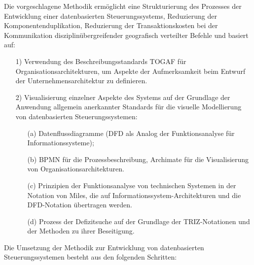 \documentclass[11pt,a4paper]{article}
\begin{document}
Die vorgeschlagene Methodik ermöglicht eine Strukturierung des Prozesses der
Entwicklung einer datenbasierten Steuerungssystems, Reduzierung der
Komponentenduplikation, Reduzierung der Transaktionskosten bei der
Kommunikation disziplinübergreifender geografisch verteilter Befehle und
basiert auf:
\begin{itemize}
\item[1)] Verwendung des Beschreibungsstandards TOGAF für
  Organisationsarchitekturen, um Aspekte der Aufmerksamkeit beim Entwurf der
  Unternehmensarchitektur zu definieren.
\item[2)] Visualisierung einzelner Aspekte des Systems auf der Grundlage der
  Anwendung allgemein anerkannter Standards für die visuelle Modellierung von
  datenbasierten Steuerungssystemen:
  \begin{itemize}
  \item[(a)] Datenflussdiagramme (DFD als Analog der Funktionsanalyse für
    Informationssysteme);
  \item[(b)] BPMN für die Prozessbeschreibung, Archimate für die
    Visualisierung von Organisationsarchitekturen.
  \item[(c)] Prinzipien der Funktionsanalyse von technischen Systemen in der
    Notation von Miles, die auf Informationssystem-Architekturen und die
    DFD-Notation übertragen werden.
  \item[(d)] Prozess der Defizitsuche auf der Grundlage der TRIZ-Notationen
    und der Methoden zu ihrer Beseitigung.
\end{itemize}
\end{itemize}
Die Umsetzung der Methodik zur Entwicklung von datenbasierten
Steuerungssystemen besteht aus den folgenden Schritten:
\end{document}

